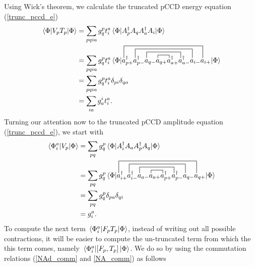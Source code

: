 \documentclass[Dual]{msu-thesis}
\begin{document}
Using Wick's theorem, we calculate the truncated pCCD energy equation (\ref{trunc_pccd_e})
\begin{align}
\mel{\Phi}{V_pT_p}{\Phi}
&=
\sum_{pqia}g_q^pt_i^a\mel{\Phi}{A^\dagger_pA_qA^\dagger_aA_i}{\Phi}
\nonumber
\\
&=
\sum_{pqia}g_q^pt_i^a\mel{\Phi}{
\contraction[1ex]{a^\dagger_{p+}a^\dagger_{p-}a_{q-}}{a}{_{q+}}
{a}
\contraction[2ex]{a^\dagger_{p+}a^\dagger_{p-}}{a}{_{q-}a_{q+}
a^\dagger_{a+}}{a}
\contraction[3ex]{a^\dagger_{p+}}{a}{^\dagger_{p-}a_{q-}a_{q+}
a^\dagger_{a+}a^\dagger_{a-}}{a}
\contraction[4ex]{}{a}{^\dagger_{p+}a^\dagger_{p-}a_{q-}a_{q+}
a^\dagger_{a+}a^\dagger_{a-}a_{i-}}{a}
a^\dagger_{p+}a^\dagger_{p-}a_{q-}a_{q+}
a^\dagger_{a+}a^\dagger_{a-}a_{i-}a_{i+}
}{\Phi}
\nonumber
\\
&=
\sum_{pqia}g_q^pt_i^a\delta_{pi}\delta_{qa}
\nonumber
\\
&=
\sum_{ia}g_a^it_i^a
.\end{align}
Turning our attention now to the truncated pCCD amplitude equation (\ref{trunc_pccd_e}), we start with
\begin{align}
\mel*{\Phi_i^a}{V_p}{\Phi}
&=
\sum_{pq}g_q^p\mel*{\Phi}{A^\dagger_iA_aA^\dagger_pA_q}{\Phi}
\nonumber
\\
&=
\sum_{pq}g_q^p\mel*{\Phi}{
\contraction[1ex]{a^\dagger_{i+}a^\dagger_{i-}a_{a-}}{a}{_{a+}}
{a}
\contraction[2ex]{a^\dagger_{i+}a^\dagger_{i-}}{a}{_{a-}a_{a+}
a^\dagger_{p+}}{a}
\contraction[3ex]{a^\dagger_{i+}}{a}{^\dagger_{i-}a_{a-}a_{a+}
a^\dagger_{p+}a^\dagger_{p-}}{a}
\contraction[4ex]{}{a}{^\dagger_{i+}a^\dagger_{i-}a_{a-}a_{a+}
a^\dagger_{p+}a^\dagger_{p-}a_{q-}}{a}
a^\dagger_{i+}a^\dagger_{i-}a_{a-}a_{a+}a^\dagger_{p+}a^\dagger_{p-}a_{q-}a_{q+}
}{\Phi}
\nonumber
\\
&=
\sum_{pq}g_q^p\delta_{pa}\delta_{qi}
\nonumber
\\
&=g_i^a
.\end{align}
To compute the next term $\mel*{\Phi_i^a}{F_pT_p}{\Phi}$, instead of writing out all possible contractions, it will be easier to compute the un-truncated term from which the this term comes, namely $\mel*{\Phi_i^a}{\comm*{F_p}{T_p}}{\Phi}$. We do so by using the commutation relations (\ref{NAd_comm} and \ref{NA_comm}) as follows
\end{document}
